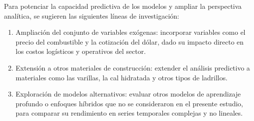 \justify
Para potenciar la capacidad predictiva de los modelos y ampliar la perspectiva analítica, se sugieren las siguientes líneas de investigación:
\begin{enumerate}
\item Ampliación del conjunto de variables exógenas: incorporar variables como el precio del combustible y la cotización del dólar, dado su impacto directo en los costos logísticos y operativos del sector.
\item Extensión a otros materiales de construcción: extender el análisis predictivo a materiales como las varillas, la cal hidratada y otros tipos de ladrillos.
\item Exploración de modelos alternativos: evaluar otros modelos de aprendizaje profundo o enfoques híbridos que no se consideraron en el presente estudio, para comparar su rendimiento en series temporales complejas y no lineales.
\end{enumerate}